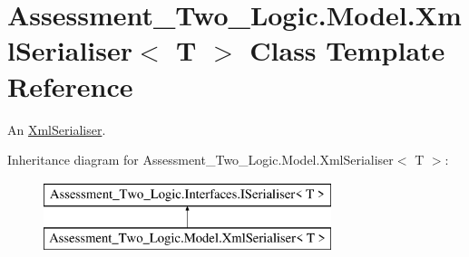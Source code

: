 \hypertarget{class_assessment___two___logic_1_1_model_1_1_xml_serialiser-g}{
\section{Assessment\_\-Two\_\-Logic.Model.XmlSerialiser$<$ T $>$ Class Template Reference}
\label{class_assessment___two___logic_1_1_model_1_1_xml_serialiser-g}
}


An \hyperlink{class_assessment___two___logic_1_1_model_1_1_xml_serialiser-g}{XmlSerialiser}.  


Inheritance diagram for Assessment\_\-Two\_\-Logic.Model.XmlSerialiser$<$ T $>$:\begin{figure}[H]
\begin{center}
\leavevmode
\includegraphics[height=2.000000cm]{class_assessment___two___logic_1_1_model_1_1_xml_serialiser-g}
\end{center}
\end{figure}
